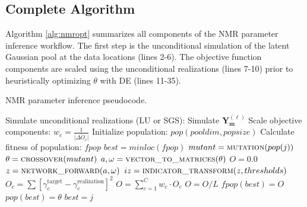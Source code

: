 \subsection{Complete Algorithm}
\label{subsec:04algorithm}

Algorithm \ref{alg:nmropt} summarizes all components of the \gls{NMR} parameter inference workflow. The first step is the unconditional simulation of the latent Gaussian pool at the data locations (lines 2-6). The objective function components are scaled using the unconditional realizations (lines 7-10) prior to heuristically optimizing $\theta$ with \gls{DE} (lines 11-35).

\begin{algorithm}
    \caption{\gls{NMR} parameter inference pseudocode.}\label{alg:nmropt}
    \begin{algorithmic}[1]
        \State Simulate unconditional realizations (LU or SGS):
        \State Simulate $\mathbf{Y^{(\ell)}_m}$
        \EndFor
        \EndFor
        \State Scale objective components:
        \State $w_{c} = \frac{1}{\bar{|\Delta O_{c}|}}$
        \EndFor
        \State Initialize population: $pop(pool dim, popsize)$ 
        \State Calculate fitness of population: $fpop$
        \State $best = minloc(fpop)$ 
         
        \State $mutant = \Call{mutation}{pop(j)}$ 
        \State $\theta = \Call{crossover}{mutant}$ 
        \State $a, \omega = \Call{vector\_to\_matrices}{\theta}$ 
        \State $O = 0.0$
        \State $z = \Call{network\_forward}{a, \omega}$ 
        \State $iz = \Call{indicator\_transform}{z, thresholds}$
        \State $O_{c} = \sum [ \gamma^{\text{target}}_{c} - \gamma^{\text{realization}}_{c}]^{2}$
        \EndFor
        \State $O = \sum_{c=1}^{C}w_{c}\cdot O_{c}$
        \EndFor
        \State $O = O / L$
        \State $fpop(best) = O$ 
        \State $pop(best) = \theta$ 
        \State $best = j$ 
        \EndIf
        \EndFor
        \EndFor {}
    \end{algorithmic}
\end{algorithm}

